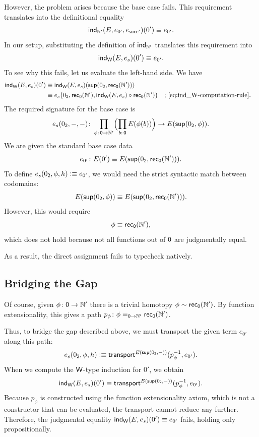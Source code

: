However, the problem arises because the base case fails. This requirement translates into the definitional equality
\[
    \mathsf{ind}_{\mathbb{N}'}(E,e_{0'},e_{\mathsf{succ}'})(0')
        \equiv e_{0'}.
\]
In our setup, substituting the definition of $\mathsf{ind}_{\mathbb{N}'}$ translates this requirement into
\[
    \mathsf{ind}_{\mathsf{W}}(E,e_s)(0')
        \equiv e_{0'}.
\]
To see why this fails, let us evaluate the left-hand side. We have
\begin{align*}
    \mathsf{ind}_{\mathsf{W}}(E,e_s)(0')
        &\equiv \mathsf{ind}_{\mathsf{W}}(E,e_s)
            (\mathsf{sup}(0_{\mathsf{2}},\mathsf{rec}_{\mathsf{0}}(\mathbb{N}')))\\
        &\equiv e_s\bigl(
                0_{\mathsf{2}},
                \mathsf{rec}_{\mathsf{0}}(\mathbb{N}'),
                \mathsf{ind}_{\mathsf{W}}(E,e_s)
                    \circ\mathsf{rec}_{\mathsf{0}}(\mathbb{N}')
            \bigr)
            &&\text{; \eqref{eq:ind_W-computation-rule}}.
\end{align*}
The required signature for the base case is
\[
    e_s(0_{\fun2},\dummy,\dummy)\colon
    \prod_{\phi\colon\fun0\to\N'}
    \Bigl(\prod_{b\colon\fun0}E(\phi(b))\Bigr)
    \to E(\fun{sup}(0_{\fun2},\phi)).
\]
We are given the standard base case data
\[
    e_{0'}\colon E(0')
        \equiv E(\fun{sup}(0_{\fun2},\fun{rec}_{\fun0}(\N'))).
\]
To define $e_s(0_{\mathsf{2}},\phi,h)\mathrel{\vcentcolon}\equiv e_{0'}$, we would need the strict syntactic match between codomains:
\[
    E(\mathsf{sup}(0_{\mathsf{2}},\phi))
    \equiv
    E(\mathsf{sup}(0_{\mathsf{2}},\mathsf{rec}_{\mathsf{0}}(\mathbb{N}'))).
\]
However, this would require
\[
    \phi\equiv\mathsf{rec}_{\mathsf{0}}(\mathbb{N}'),
\]
which does not hold because not all functions out of $\mathsf{0}$ are judgmentally equal.

As a result, the direct assignment fails to typecheck natively.

\subsection{Bridging the Gap}

Of course, given $\phi\colon\fun0\to\N'$ there is a trivial homotopy $\phi\sim\mathsf{rec}_{\mathsf{0}}(\mathbb{N}')$. By function extensionality, this gives a path $p_\phi\colon\phi\eq{\fun0\to\N'}\fun{rec}_{\fun0}(\N')$.

Thus, to bridge the gap described above, we must transport the given term $e_{0'}$ along this path:
\[
    e_s(0_{\mathsf{2}},\phi,h)
        \mathrel{\vcentcolon}\equiv\mathsf{transport}^{E(\mathsf{sup}(0_{\mathsf{2}},{\mathord-}))}
            (p_\phi^{-1},e_{0'}).
\]
When we compute the $\mathsf{W}$-type induction for $0'$, we obtain
\[
    \mathsf{ind}_{\mathsf{W}}(E,e_s)(0')
        \equiv\mathsf{transport}^{E(\mathsf{sup}(0_{\mathsf{2}},{\mathord-}))}(p_\phi^{-1},e_{0'}).
\]
Because $p_\phi$ is constructed using the function extensionality axiom, which is not a constructor that can be evaluated, the transport cannot reduce any further. Therefore, the judgmental equality $\mathsf{ind}_{\mathsf{W}}(E,e_s)(0')\equiv e_{0'}$ fails, holding only propositionally.

